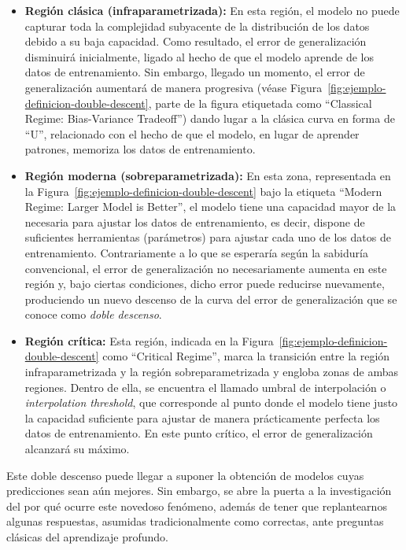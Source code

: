 \begin{itemize}
    \item \textbf{Región clásica (infraparametrizada):} En esta región, el modelo no puede capturar toda la complejidad subyacente de la distribución de los datos debido a su baja capacidad. Como resultado, el error de generalización disminuirá inicialmente, ligado al hecho de que el modelo aprende de los datos de entrenamiento. Sin embargo, llegado un momento, el error de generalización aumentará de manera progresiva (véase Figura~\ref{fig:ejemplo-definicion-double-descent}, parte de la figura etiquetada como ``Classical Regime: Bias-Variance Tradeoff'') dando lugar a la clásica curva en forma de ``U'', relacionado con el hecho de que el modelo, en lugar de aprender patrones, memoriza los datos de entrenamiento.

    \item \textbf{Región moderna (sobreparametrizada):} En esta zona, representada en la Figura~\ref{fig:ejemplo-definicion-double-descent} bajo la etiqueta ``Modern Regime: Larger Model is Better'', el modelo tiene una capacidad mayor de la necesaria para ajustar los datos de entrenamiento, es decir, dispone de suficientes herramientas (parámetros) para ajustar cada uno de los datos de entrenamiento. Contrariamente a lo que se esperaría según la sabiduría convencional, el error de generalización no necesariamente aumenta en este región y, bajo ciertas condiciones, dicho error puede reducirse nuevamente, produciendo un nuevo descenso de la curva del error de generalización que se conoce como \emph{doble descenso}.
    
    \item \textbf{Región crítica:} Esta región, indicada en la Figura~\ref{fig:ejemplo-definicion-double-descent} como ``Critical Regime'', marca la transición entre la región infraparametrizada y la región sobreparametrizada y engloba zonas de ambas regiones. Dentro de ella, se encuentra el llamado umbral de interpolación o \textit{interpolation threshold}, que corresponde al punto donde el modelo tiene justo la capacidad suficiente para ajustar de manera prácticamente perfecta los datos de entrenamiento. En este punto crítico, el error de generalización alcanzará su máximo.
       
\end{itemize}

Este doble descenso puede llegar a suponer la obtención de modelos cuyas predicciones sean aún mejores. Sin embargo, se abre la puerta a la investigación del por qué ocurre este novedoso fenómeno, además de tener que replantearnos algunas respuestas, asumidas tradicionalmente como correctas, ante preguntas clásicas del aprendizaje profundo.

